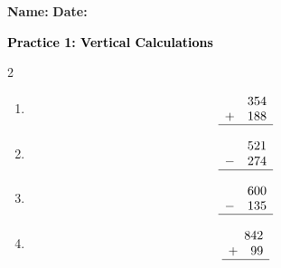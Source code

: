 \documentclass[12pt, letterpaper, fleqn]{article}
\begin{document}
\textbf{Name:} \underline{\hspace{5cm}}
\hfill
\textbf{Date:} \underline{\hspace{3cm}}\\

\begin{tcolorbox}[colback=customteal!20]
    \large\textcolor{black}{\textbf{Practice 1: Vertical Calculations}}
\end{tcolorbox}

\vspace{5mm}
\begin{multicols}{2}
\begin{enumerate}[itemsep=3cm, leftmargin=0.6cm]
\item 
\[
\begin{array}{r}
  354 \\
  +\quad 188 \\
  \hline
\end{array}
\]

\item 
\[
\begin{array}{r}
  521 \\
  -\quad 274 \\
  \hline
\end{array}
\]

\item 
\[
\begin{array}{r}
  600 \\
  -\quad 135 \\
  \hline
\end{array}
\]

\item 
\[
\begin{array}{r}
  842 \\
  +\quad 99 \\
  \hline
\end{array}
\]
\end{enumerate}
\end{multicols}
\end{document}
